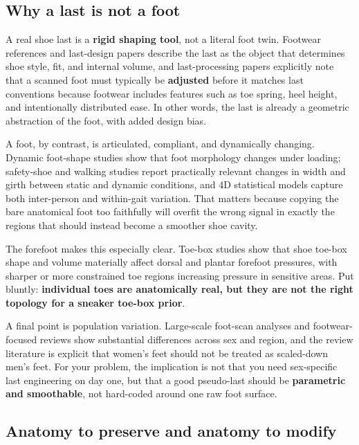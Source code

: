 \documentclass[
  10.5pt,
]{article}
\begin{document}
\subsection{Why a last is not a foot}\label{why-a-last-is-not-a-foot}

A real shoe last is a \textbf{rigid shaping tool}, not a literal foot
twin. Footwear references and last-design papers describe the last as
the object that determines shoe style, fit, and internal volume, and
last-processing papers explicitly note that a scanned foot must
typically be \textbf{adjusted} before it matches last conventions
because footwear includes features such as toe spring, heel height, and
intentionally distributed ease. In other words, the last is already a
geometric abstraction of the foot, with added design bias.

A foot, by contrast, is articulated, compliant, and dynamically
changing. Dynamic foot-shape studies show that foot morphology changes
under loading; safety-shoe and walking studies report practically
relevant changes in width and girth between static and dynamic
conditions, and 4D statistical models capture both inter-person and
within-gait variation. That matters because copying the bare anatomical
foot too faithfully will overfit the wrong signal in exactly the regions
that should instead become a smoother shoe cavity.

The forefoot makes this especially clear. Toe-box studies show that shoe
toe-box shape and volume materially affect dorsal and plantar forefoot
pressures, with sharper or more constrained toe regions increasing
pressure in sensitive areas. Put bluntly: \textbf{individual toes are
anatomically real, but they are not the right topology for a sneaker
toe-box prior}.

A final point is population variation. Large-scale foot-scan analyses
and footwear-focused reviews show substantial differences across sex and
region, and the review literature is explicit that women's feet should
not be treated as scaled-down men's feet. For your problem, the
implication is not that you need sex-specific last engineering on day
one, but that a good pseudo-last should be \textbf{parametric and
smoothable}, not hard-coded around one raw foot surface.

\subsection{Anatomy to preserve and anatomy to
modify}\label{anatomy-to-preserve-and-anatomy-to-modify}
\end{document}
